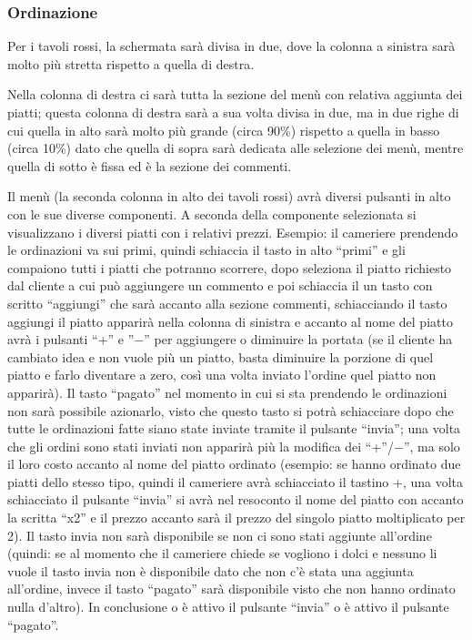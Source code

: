 \documentclass[12pt, letterpaper]{book}
\begin{document}
\subsubsection{Ordinazione}
Per i tavoli rossi, la schermata sarà divisa in due, dove la colonna a sinistra sarà molto più stretta rispetto a quella di destra.

Nella colonna di destra ci sarà tutta la sezione del menù con relativa aggiunta dei piatti; questa colonna di destra sarà a sua volta divisa in due, ma in due righe di cui quella in alto sarà molto più grande (circa 90\%) rispetto a quella in basso (circa 10\%) dato che quella di sopra sarà dedicata alle selezione dei menù, mentre quella di sotto è fissa ed è la sezione dei commenti.

Il menù (la seconda colonna in alto dei tavoli rossi) avrà diversi pulsanti in alto con le sue diverse componenti. A seconda della componente selezionata si visualizzano i diversi piatti con i relativi prezzi. Esempio: il cameriere prendendo le ordinazioni va sui primi, quindi schiaccia il tasto in alto “primi” e gli compaiono tutti i piatti che potranno scorrere, dopo seleziona il piatto richiesto dal cliente a cui può aggiungere un commento e poi schiaccia il un tasto con scritto “aggiungi” che sarà accanto alla sezione commenti, schiacciando il tasto aggiungi il piatto apparirà nella colonna di sinistra e accanto al nome del piatto avrà i pulsanti “+” e ”$-$” per aggiungere o diminuire la portata (se il cliente ha cambiato idea e non vuole più un piatto, basta diminuire la porzione di quel piatto e farlo diventare a zero, così una volta inviato l'ordine quel piatto non apparirà). Il tasto “pagato” nel momento in cui si sta prendendo le ordinazioni non sarà possibile azionarlo, visto che questo tasto si potrà schiacciare dopo che tutte le ordinazioni fatte siano state inviate tramite il pulsante “invia”; una volta che gli ordini sono stati inviati non apparirà più la modifica dei “+”/$-$”, ma solo il loro costo accanto al nome del piatto ordinato (esempio: se hanno ordinato due piatti dello stesso tipo, quindi il cameriere avrà schiacciato il tastino +, una volta schiacciato il pulsante “invia” si avrà nel resoconto il nome del piatto con accanto la scritta “x2” e il prezzo accanto sarà il prezzo del singolo piatto moltiplicato per 2). Il tasto invia non sarà disponibile se non ci sono stati aggiunte all'ordine (quindi: se al momento che il cameriere chiede se vogliono i dolci e nessuno li vuole il tasto invia non è disponibile dato che non c'è stata una aggiunta all'ordine, invece il tasto “pagato” sarà disponibile visto che non hanno ordinato nulla d'altro). In conclusione o è attivo il pulsante “invia” o è attivo il pulsante “pagato”.
\end{document}
